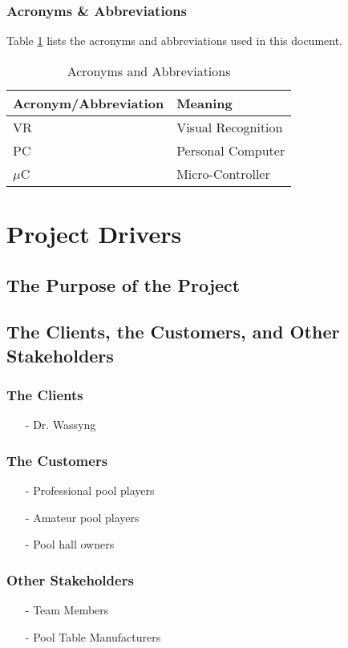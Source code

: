 \documentclass[titlepage]{article}
\begin{document}
\subsubsection{Acronyms \& Abbreviations}
Table \ref{tab:Acronyms} lists the acronyms and abbreviations used in this document.
\begin{table}[h!]
\centering
\caption{Acronyms and Abbreviations}
\begin{tabular}{| p{6cm} | p{6cm} |}\hline
	\textbf{Acronym/Abbreviation}	&\textbf{Meaning}\\\hline
	VR								&Visual Recognition\\\hline
	PC								&Personal Computer\\\hline
	$\mu$C							&Micro-Controller\\\hline
\end{tabular}
\label{tab:Acronyms}
\end{table}


\section{Project Drivers}
\subsection{The Purpose of the Project}

\subsection{The Clients, the Customers, and Other Stakeholders}
\subsubsection{The Clients}
\begin{itemize}
	\item[-] Dr. Wassyng
\end{itemize}
\subsubsection{The Customers}
\begin{itemize}
	\item[-] Professional pool players
	\item[-] Amateur pool players
	\item[-] Pool hall owners
\end{itemize}
\subsubsection{Other Stakeholders}
\begin{itemize}
	\item[-] Team Members
	\item[-] Pool Table Manufacturers
\end{itemize}
\end{document}

